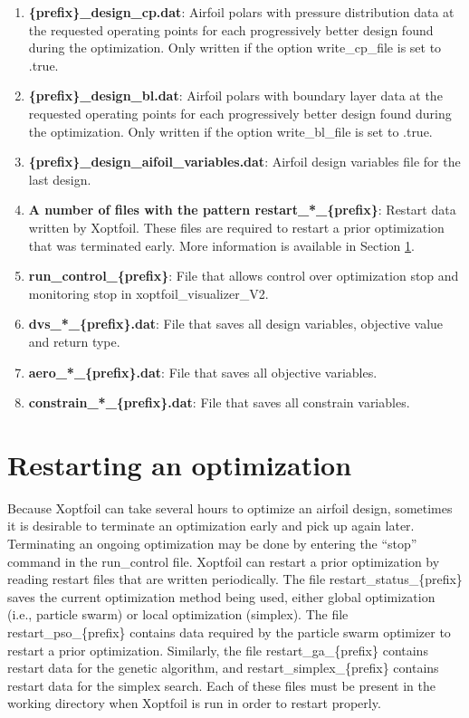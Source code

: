 \documentclass[11pt]{article}
\begin{document}
\begin{enumerate}
\item{\textbf{\{prefix\}\_design\_cp.dat}: Airfoil polars with pressure distribution
data at the requested operating points for each progressively better design found during the 
optimization.  Only written if the option write\_cp\_file is set to .true.}

\item{\textbf{\{prefix\}\_design\_bl.dat}: Airfoil polars with boundary layer
data at the requested operating points for each progressively better design found during the 
optimization.  Only written if the option write\_bl\_file  is set to .true.}

\item{\textbf{\{prefix\}\_design\_aifoil\_variables.dat}: Airfoil design variables file for the
	last design.}


\item{\textbf{A number of files with the pattern restart\_*\_\{prefix\}}: Restart data
written by Xoptfoil.  These files are required to restart a prior optimization that was
terminated early. More information is available in Section \ref{sec:restarting}.}

\item{\textbf{run\_control\_\{prefix\}}: File that allows control over optimization stop and monitoring stop in 
	xoptfoil\_visualizer\_V2.}

\item{\textbf{dvs\_*\_\{prefix\}.dat}: File that saves all design variables, objective value and return type.}
\item{\textbf{aero\_*\_\{prefix\}.dat}: File that saves all objective variables.}
\item{\textbf{constrain\_*\_\{prefix\}.dat}: File that saves all constrain variables.}
\end{enumerate}

\section{Restarting an optimization}\label{sec:restarting}

Because Xoptfoil can take several hours to optimize an airfoil design, sometimes it is
desirable to terminate an optimization early and pick up again later. Terminating an
ongoing optimization may be done by entering the ``stop'' command in the run\_control
file. Xoptfoil can restart a prior optimization
by reading restart files that are written periodically. The file
restart\_status\_\{prefix\}
saves the current optimization method being used, either global optimization (i.e.,
particle swarm) or local optimization (simplex).  The file restart\_pso\_\{prefix\} contains
data required by the particle swarm optimizer to restart a prior optimization. Similarly,
the file restart\_ga\_\{prefix\} contains restart data for the genetic algorithm,
and restart\_simplex\_\{prefix\} contains restart data for the simplex search.
Each of these files must be
present in the working directory when Xoptfoil is run in order to restart properly.
\end{document}
